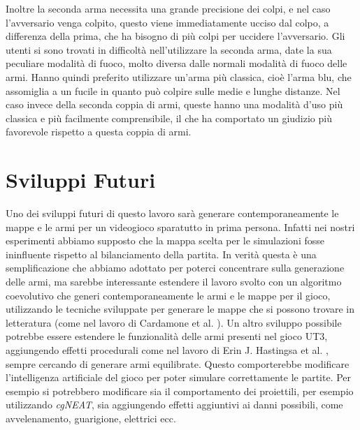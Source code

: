 \documentclass[12pt, italian]{toptesi}
\begin{document}
Inoltre la seconda arma necessita una grande precisione dei colpi, e nel caso l'avversario venga colpito, questo viene immediatamente ucciso dal colpo, a differenza della prima, che ha bisogno di più colpi per uccidere l'avversario.
Gli utenti si sono trovati in difficoltà nell'utilizzare la seconda arma, date la sua peculiare modalità di fuoco, molto diversa dalle normali modalità di fuoco delle armi.
Hanno quindi preferito utilizzare un'arma più classica, cioè l'arma blu, che assomiglia a un fucile in quanto può colpire sulle medie e lunghe distanze.
Nel caso invece della seconda coppia di armi, queste hanno una modalità d'uso più classica e più facilmente comprensibile, il che ha comportato un giudizio più favorevole rispetto a questa coppia di armi.


\section{Sviluppi Futuri}

Uno dei sviluppi futuri di questo lavoro sarà generare contemporaneamente le mappe e le armi per un videogioco sparatutto in prima persona. Infatti nei nostri esperimenti abbiamo supposto che la mappa scelta per le simulazioni fosse ininfluente rispetto al bilanciamento della partita. In verità questa è una semplificazione che abbiamo adottato per poterci concentrare sulla generazione delle armi, ma sarebbe interessante estendere il lavoro svolto con un algoritmo coevolutivo che generi contemporaneamente le armi e le mappe per il gioco, utilizzando le tecniche sviluppate per generare le mappe che si possono trovare in letteratura (come nel lavoro di Cardamone et al. \cite{fpsmaps:article}).
Un altro sviluppo possibile potrebbe essere estendere le funzionalità delle armi presenti nel gioco UT3, aggiungendo effetti procedurali come nel lavoro di Erin J. Hastingsa et al. \cite{gar:article}, sempre cercando di generare armi equilibrate. Questo comporterebbe modificare l'intelligenza artificiale del gioco per poter simulare correttamente le partite. Per esempio si potrebbero modificare sia il comportamento dei proiettili, per esempio utilizzando \emph{cgNEAT}, sia aggiungendo effetti aggiuntivi ai danni possibili, come avvelenamento, guarigione, elettrici ecc.

\cleardoublepage
{}
{}
\printbibliography
\end{document}
